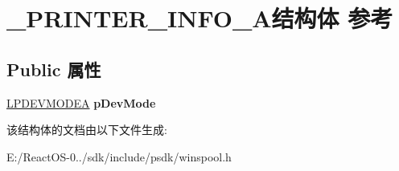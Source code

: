 \hypertarget{struct___p_r_i_n_t_e_r___i_n_f_o__8_a}{}\section{\+\_\+\+P\+R\+I\+N\+T\+E\+R\+\_\+\+I\+N\+F\+O\+\_\+A结构体 参考}
\label{struct___p_r_i_n_t_e_r___i_n_f_o__8_a}
\subsection*{Public 属性}
\begin{DoxyCompactItemize}
\item 
\mbox{\label{struct___p_r_i_n_t_e_r___i_n_f_o__8_a_a5b6501c8346fe4a66c4394b4315f41c9}} 
\hyperlink{struct__devicemode_a}{L\+P\+D\+E\+V\+M\+O\+D\+EA} {\bfseries p\+Dev\+Mode}
\end{DoxyCompactItemize}


该结构体的文档由以下文件生成\+:\begin{DoxyCompactItemize}
\item 
E\+:/\+React\+O\+S-\/0../sdk/include/psdk/winspool.\+h\end{DoxyCompactItemize}
